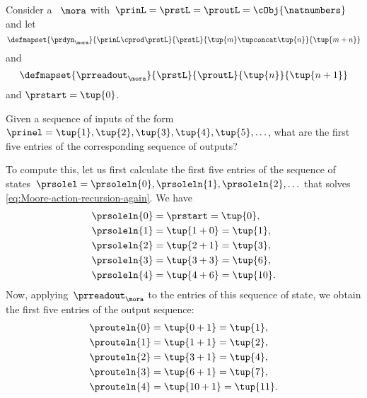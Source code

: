 \begin{example}
    \label{exa:moore-standard-action}
    Consider a ~$\mora$ with~$\prinL = \prstL = \proutL = \cObj{\natnumbers}$ and let
    \begin{equation}\label{eq:exa-moore-machine-integers-1}
        \defmapset{
            \prdyn_\mora
        }{
            \prinL \cprod \prstL
        }{
            \prstL
        }{
            \tup{m} \tupconcat \tup{n}
        }{
            \tup{m + n}
        }
    \end{equation}
    and
    \begin{equation}\label{eq:exa-moore-machine-integers-2}
        \defmapset{
            \prreadout_\mora
        }{
            \prstL
        }{
            \proutL
        }{
            \tup{n}
        }{
            \tup{n+1}
        }
    \end{equation}
    and $\prstart = \tup{0}$.

    Given a sequence of inputs of the form~$\prinel = \tup{1}, \tup{2}, \tup{3}, \tup{4}, \tup{5}, \ldots$, what are the first five entries of the corresponding sequence of outputs?

    To compute this, let us first calculate the first five entries of the sequence of states~$\prsolel = \prsoleln{0}, \prsoleln{1}, \prsoleln{2}, \ldots$ that solves \cref{eq:Moore-action-recursion-again}.
    We have
    \begin{align}\label{eq:moore-action-exa-calc-1}
        \prsoleln{0} & = \prstart = \tup{0}, \\
        \prsoleln{1} & = \tup{1 + 0} = \tup{1}, \\
        \prsoleln{2} & = \tup{2 + 1} = \tup{3}, \\
        \prsoleln{3} & = \tup{3 + 3} = \tup{6}, \\
        \prsoleln{4} & = \tup{4 + 6} = \tup{10}.
    \end{align}
    Now, applying~$\prreadout_\mora$ to the entries of this sequence of state, we obtain the first five entries of the output sequence:
    \begin{align}\label{eq:moore-action-exa-calc-2}
        \prouteln{0} & = \tup{0 + 1} = \tup{1}, \\
        \prouteln{1} & = \tup{1 + 1} = \tup{2}, \\
        \prouteln{2} & = \tup{3 + 1} = \tup{4}, \\
        \prouteln{3} & = \tup{6 + 1} = \tup{7}, \\
        \prouteln{4} & = \tup{10 + 1} = \tup{11}.
    \end{align}
\end{example}

